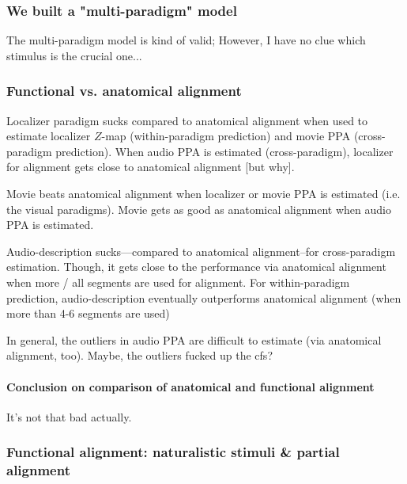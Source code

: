 \subsubsection{We built a "multi-paradigm" model}



The multi-paradigm model is kind of valid;
%
However, I have no clue which stimulus is the crucial one...


\subsubsection{Functional vs. anatomical alignment}

Localizer paradigm sucks compared to anatomical alignment when used to estimate
localizer $Z$-map (within-paradigm prediction) and movie PPA (cross-paradigm
prediction).
%
When audio PPA is estimated (cross-paradigm), localizer for alignment gets close
to anatomical alignment [but why].

%
Movie beats anatomical alignment when localizer or movie PPA is estimated (i.e.
the visual paradigms).
%
Movie gets as good as anatomical alignment when audio PPA is estimated.

%
Audio-description sucks---compared to anatomical alignment--for cross-paradigm
estimation.
%
Though, it gets close to the performance via anatomical alignment when more /
all segments are used for alignment.
%
For within-paradigm prediction, audio-description eventually outperforms
anatomical alignment (when more than 4-6 segments are used)
%

%
In general, the outliers in audio PPA are difficult to estimate (via anatomical
alignment, too).
%
Maybe, the outliers fucked up the \ac{cfs}?


\paragraph{Conclusion on comparison of anatomical and functional alignment}

It's not that bad actually.


\subsubsection{Functional alignment: naturalistic stimuli \& partial alignment}

